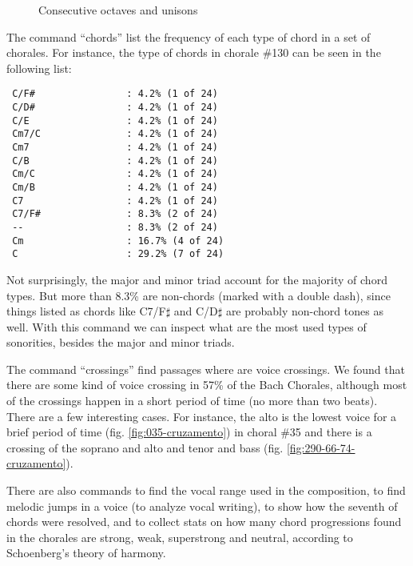 \begin{figure}[!h]
  \centering
  \qquad
  \qquad
  \caption{Consecutive octaves and unisons}
  \label{fig:oitavas-e-unissonos}
\end{figure}

The command ``chords'' list the frequency of each type of chord in a
set of chorales. For instance, the type of chords in chorale \#130
can be seen in the following list:

\begin{verbatim}
 C/F#                : 4.2% (1 of 24)
 C/D#                : 4.2% (1 of 24)
 C/E                 : 4.2% (1 of 24)
 Cm7/C               : 4.2% (1 of 24)
 Cm7                 : 4.2% (1 of 24)
 C/B                 : 4.2% (1 of 24)
 Cm/C                : 4.2% (1 of 24)
 Cm/B                : 4.2% (1 of 24)
 C7                  : 4.2% (1 of 24)
 C7/F#               : 8.3% (2 of 24)
 --                  : 8.3% (2 of 24)
 Cm                  : 16.7% (4 of 24)
 C                   : 29.2% (7 of 24)
\end{verbatim}

Not surprisingly, the major and minor triad account for the majority
of chord types. But more than 8.3\% are non-chords (marked with a
double dash), since things listed as chords like C7/F$\sharp$ and
C/D$\sharp$ are probably non-chord tones as well. With this command we
can inspect what are the most used types of sonorities, besides the
major and minor triads.

The command ``crossings'' find passages where are voice crossings. We
found that there are some kind of voice crossing in 57\% of the Bach
Chorales, although most of the crossings happen in a short period of
time (no more than two beats). There are a few interesting cases. For
instance, the alto is the lowest voice for a brief period of time
(fig. \ref{fig:035-cruzamento}) in choral \#35 and there is a crossing
of the soprano and alto and tenor and bass (fig.
\ref{fig:290-66-74-cruzamento}).

There are also commands to find the vocal range used in the
composition, to find melodic jumps in a voice (to analyze vocal
writing), to show how the seventh of chords were resolved, and to
collect stats on how many chord progressions found in the chorales are
strong, weak, superstrong and neutral, according to Schoenberg's
theory of harmony.

